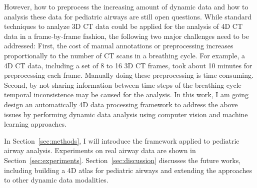 However, how to preprocess the increasing amount of dynamic data and how to analysis these data for pediatric airways are still open questions.
While standard techniques to analyze 3D CT data could be applied for the analysis of 4D CT data in a frame-by-frame fashion, the following two major challenges need to be addressed:
First, the cost of manual annotations or preprocessing increases proportionally to the number of CT scans in a breathing cycle.
For example, a 4D CT data, including a set of 8 to 16 3D CT frames, took about 10 minutes for preprocessing each frame.
Manually doing these preprocessing is time consuming.
Second, by not sharing information between time steps of the breathing cycle temporal inconsistence may be caused for the analysis.
In this work, I am going design an automatically 4D data processing framework to address the above issues by performing dynamic data analysis using computer vision and machine learning approaches.

In Section~\ref{sec:methods}, I will introduce the framework applied to pediatric airway analysis.
Experiments on real airway data are shown in Section~\ref{sec:experiments}.
Section~\ref{sec:discussion} discusses the future works, including building a 4D atlas for pediatric airways and extending the approaches to other dynamic data modalities.
